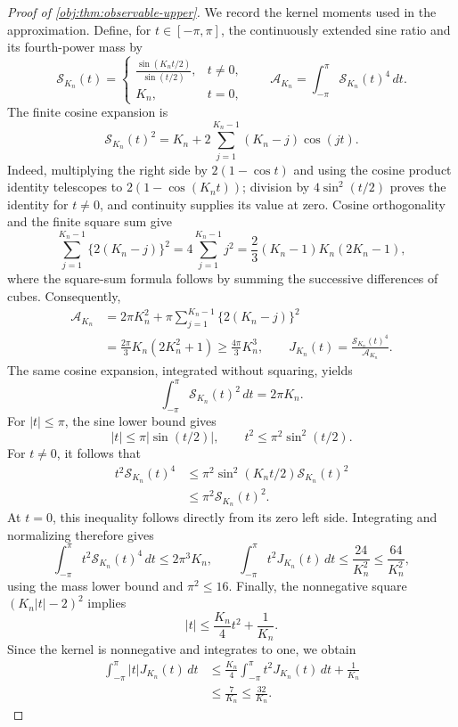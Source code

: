 \documentclass[11pt]{article}
\begin{document}
\begin{proof}[Proof of \cref{obj:thm:observable-upper}]
We record the kernel moments used in the approximation. Define, for \(t\in[-\pi,\pi]\), the continuously extended sine ratio and its fourth-power mass by
\[
\mathcal S_{K_n}(t)=
\begin{cases}
\displaystyle\frac{\sin(K_nt/2)}{\sin(t/2)},&t\ne0,\\[4pt]
K_n,&t=0,
\end{cases}
\qquad
\mathcal A_{K_n}=\int_{-\pi}^{\pi}\mathcal S_{K_n}(t)^4\,dt.
\]
The finite cosine expansion is
\[
\mathcal S_{K_n}(t)^2
=K_n+2\sum_{j=1}^{K_n-1}(K_n-j)\cos(jt).
\]
Indeed, multiplying the right side by \(2(1-\cos t)\) and using the cosine product identity telescopes to \(2(1-\cos(K_nt))\); division by \(4\sin^2(t/2)\) proves the identity for \(t\ne0\), and continuity supplies its value at zero. Cosine orthogonality and the finite square sum give
\[
\sum_{j=1}^{K_n-1}\{2(K_n-j)\}^2
=4\sum_{j=1}^{K_n-1}j^2
=\frac23(K_n-1)K_n(2K_n-1),
\]
where the square-sum formula follows by summing the successive differences of cubes. Consequently,
\[
\begin{aligned}
\mathcal A_{K_n}
&=2\pi K_n^2+
\pi\sum_{j=1}^{K_n-1}\{2(K_n-j)\}^2\\
&=\frac{2\pi}{3}K_n(2K_n^2+1)
\ge\frac{4\pi}{3}K_n^3,
\qquad
J_{K_n}(t)=\frac{\mathcal S_{K_n}(t)^4}{\mathcal A_{K_n}}.
\end{aligned}
\]
The same cosine expansion, integrated without squaring, yields
\[
\int_{-\pi}^{\pi}\mathcal S_{K_n}(t)^2\,dt=2\pi K_n.
\]
For \(|t|\le\pi\), the sine lower bound gives
\[
|t|\le\pi|\sin(t/2)|,
\qquad
t^2\le\pi^2\sin^2(t/2).
\]
For \(t\ne0\), it follows that
\[
\begin{aligned}
t^2\mathcal S_{K_n}(t)^4
&\le\pi^2\sin^2(K_nt/2)\mathcal S_{K_n}(t)^2\\
&\le\pi^2\mathcal S_{K_n}(t)^2.
\end{aligned}
\]
At \(t=0\), this inequality follows directly from its zero left side. Integrating and normalizing therefore gives
\[
\int_{-\pi}^{\pi}t^2\mathcal S_{K_n}(t)^4\,dt
\le2\pi^3K_n,
\qquad
\int_{-\pi}^{\pi}t^2J_{K_n}(t)\,dt
\le\frac{24}{K_n^2}\le\frac{64}{K_n^2},
\]
using the mass lower bound and \(\pi^2\le16\).
Finally, the nonnegative square \((K_n|t|-2)^2\) implies
\[
|t|\le\frac{K_n}{4}t^2+\frac1{K_n}.
\]
Since the kernel is nonnegative and integrates to one, we obtain
\[
\begin{aligned}
\int_{-\pi}^{\pi}|t|J_{K_n}(t)\,dt
&\le\frac{K_n}{4}
\int_{-\pi}^{\pi}t^2J_{K_n}(t)\,dt+\frac1{K_n}\\
&\le\frac7{K_n}\le\frac{32}{K_n}.

\end{aligned}\]
\end{proof}
\end{document}
